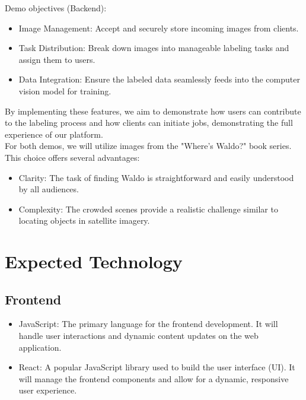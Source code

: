 \documentclass{article}
\begin{document}
Demo objectives (Backend):

\begin{itemize}
    \item Image Management: Accept and securely store incoming images from clients.
    \item Task Distribution: Break down images into manageable labeling tasks and assign them to users.
    \item Data Integration: Ensure the labeled data seamlessly feeds into the computer vision model for training.
\end{itemize}

By implementing these features, we aim to demonstrate how users can contribute to the labeling process and how clients can initiate jobs, demonstrating the full experience of our platform.\\

For both demos, we will utilize images from the "Where's Waldo?" book series. This choice offers several advantages:

\begin{itemize}
    \item Clarity: The task of finding Waldo is straightforward and easily understood by all audiences.
    \item Complexity: The crowded scenes provide a realistic challenge similar to locating objects in satellite imagery.
\end{itemize}


  \section{Expected Technology}

  \subsection{Frontend}
  \begin{itemize}
      \item JavaScript: The primary language for the frontend development. It will handle user interactions and dynamic content updates on the web application.
  
      \item React: A popular JavaScript library used to build the user interface (UI). It will manage the frontend components and allow for a dynamic, responsive user experience.
  \end{itemize}
  
\end{document}
